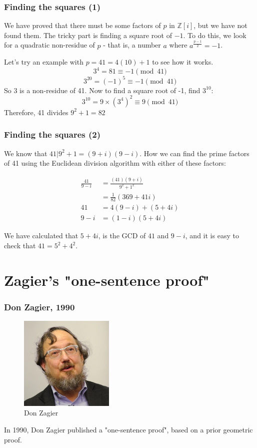 \documentclass{beamer}
\begin{document}
\begin{frame}
	\frametitle{Finding the squares (1)}

	We have proved that there must be some factors of $p$ in $\mathbb{Z}[i]$, but we
	have not found them. The tricky part is finding a square root of $-1$. To do this,
	we look for a quadratic non-residue of $p$ - that is, a number $a$ where 
	$a^{\frac{p-1}{2}} = -1$. 

	Let's try an example with $p=41 = 4(10)+1$ to see how it works.
	\[ 3^4 = 81 \equiv -1 \pmod{41} \]
	\[ 3^{20} = (-1)^5 \equiv -1 \pmod{41} \]
	So 3 is a non-residue of 41. Now to find a square root of -1, find $3^{10}$:
	\[ 3^{10} = 9\times(3^4)^2 \equiv 9 \pmod{41} \]
	Therefore, 41 divides $9^2 + 1 = 82$
\end{frame}

\begin{frame}
	\frametitle{Finding the squares (2)}

	We know that $41|9^2+1 = (9+i)(9-i)$. How we can find the prime factors of 41
	using the Euclidean division algorithm with either of these factors:

	\begin{align*}
		\frac{41}{9-i} &= \frac{(41)(9+i)}{9^2+1^2} \\
		 &= \frac{1}{82}(369 + 41i) \\
		41  &= 4(9-i) + (5+4i) \\
		9-i &= (1-i)(5+4i)
	\end{align*}

	We have calculated that $5+4i$, is the GCD of $41$ and $9-i$, and it is easy to
	check that $41 = 5^2 + 4^2$.

\end{frame}

\section{Zagier's "one-sentence proof"}

\begin{frame}
        \frametitle{Don Zagier, 1990}
        \begin{figure}
                \includegraphics[width=0.4\textwidth]{480px-DonZagier-talking.jpeg}
                \caption*{Don Zagier}
                \label{fig:zagier1}
        \end{figure}

	In 1990, Don Zagier published a "one-sentence proof", based on a prior geometric proof.
\end{frame}
\end{document}
